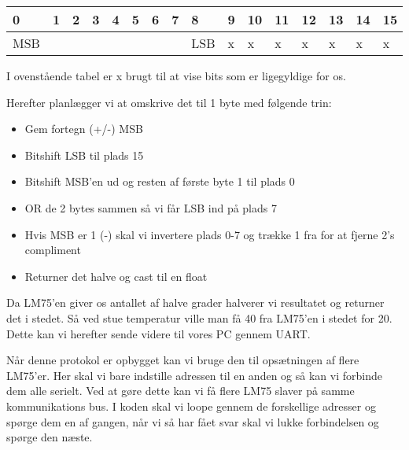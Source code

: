 \documentclass[../main.tex]{subfiles}
\begin{document}
\begin{table}[h]
    \centering
    \begin{tabular}{|llllllllllllllll|}
    \hline
    \multicolumn{1}{|l|}{0}   & \multicolumn{1}{l|}{1} & \multicolumn{1}{l|}{2}  & \multicolumn{1}{l|}{3}  & \multicolumn{1}{l|}{4}  & \multicolumn{1}{l|}{5}  & \multicolumn{1}{l|}{6}  & \multicolumn{1}{l|}{7}  & \multicolumn{1}{|l|}{8}   & \multicolumn{1}{l|}{9} & \multicolumn{1}{l|}{10} & \multicolumn{1}{l|}{11} & \multicolumn{1}{l|}{12} & \multicolumn{1}{l|}{13} & \multicolumn{1}{l|}{14} & \multicolumn{1}{l|}{15} \\ \hline
    MSB &                        &                         &                         &                         &                         &                         &                      & \multicolumn{1}{l|}{LSB} & \multicolumn{1}{l|}{x} & \multicolumn{1}{l|}{x}  & \multicolumn{1}{l|}{x}  & \multicolumn{1}{l|}{x}  & \multicolumn{1}{l|}{x}  & \multicolumn{1}{l|}{x}  & \multicolumn{1}{l|}{x}  \\ \hline    
    \end{tabular}
\end{table}
I ovenstående tabel er x brugt til at vise bits som er ligegyldige for os.

Herefter planlægger vi at omskrive det til 1 byte med følgende trin:
\begin{itemize}
    \item Gem fortegn (+/-) MSB
    \item Bitshift LSB til plads 15
    \item Bitshift MSB'en ud og resten af første byte 1 til plads 0
    \item OR de 2 bytes sammen så vi får LSB ind på plads 7
    \item Hvis MSB er 1 (-) skal vi invertere plads 0-7 og trække 1 fra for at fjerne 2's compliment
    \item Returner det halve og cast til en float
\end{itemize}
Da LM75'en giver os antallet af halve grader halverer vi resultatet og returner det i stedet. Så ved stue temperatur ville man få 40 fra LM75'en i stedet for 20.
Dette kan vi herefter sende videre til vores PC gennem UART.

Når denne protokol er opbygget kan vi bruge den til opsætningen af flere LM75'er. Her skal vi bare indstille adressen til en anden og så kan vi forbinde dem alle serielt.
Ved at gøre dette kan vi få flere LM75 slaver på samme kommunikations bus. I koden skal vi loope gennem de forskellige adresser og spørge dem en af gangen, når vi så har fået svar skal vi lukke forbindelsen og spørge den næste.
\newpage
\end{document}
